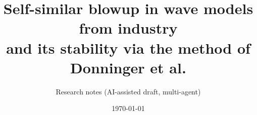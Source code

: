 \documentclass[11pt,a4paper]{article}
\title{Self-similar blowup in wave models from industry\\[2pt]
\large and its stability via the method of Donninger et al.}
\author{Research notes (AI-assisted draft, multi-agent)}
\date{\today}
\numberwithin{equation}{section}
\theoremstyle{plain}
\theoremstyle{definition}
\theoremstyle{remark}
\begin{document}
\maketitle

\begin{abstract}

\end{abstract}

\tableofcontents














\end{document}
